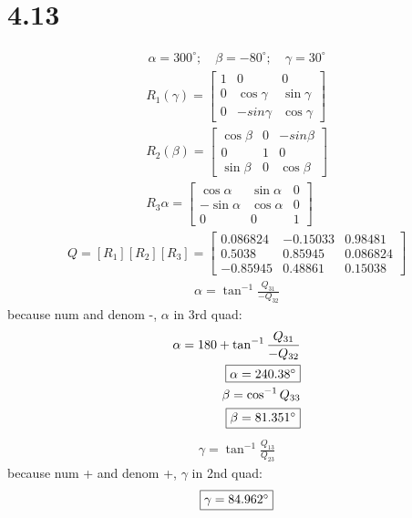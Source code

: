 \documentclass[12 pt]{article}
\begin{document}
\section*{4.13}
\begin{align*}
    \alpha=300^{\circ}; \quad \beta=-80^{\circ}; \quad \gamma=30^{\circ}
\end{align*}
\begin{align*}
    R_1(\gamma)=\begin{bmatrix}
        1 & 0 & 0 \\
        0 & \cos{\gamma} & \sin{\gamma} \\
        0 & -sin{\gamma} & \cos{\gamma}
    \end{bmatrix} \\
    R_2(\beta)=\begin{bmatrix}
        \cos{\beta} & 0 & -sin{\beta} \\
        0 & 1 & 0 \\
        \sin{\beta} & 0 & \cos{\beta}
    \end{bmatrix} \\
    R_3{\alpha}=\begin{bmatrix}
        \cos{\alpha} & \sin{\alpha} & 0 \\
        -\sin{\alpha} & \cos{\alpha} & 0 \\
        0 & 0 & 1
    \end{bmatrix}
\end{align*}
\begin{align*}
    Q = [R_1][R_2][R_3]=\begin{bmatrix}
        0.086824 & -0.15033 & 0.98481 \\
        0.5038 & 0.85945 & 0.086824 \\
        -0.85945 & 0.48861 & 0.15038
    \end{bmatrix}
\end{align*}
\begin{align*}
    \alpha= \tan^{-1}{\frac{Q_{31}}{-Q_{32}}}
\end{align*}
because num and denom -, $\alpha$ in 3rd quad:
\begin{align*}
    \alpha=180+\tan^{-1}{\frac{Q_{31}}{-Q_{32}}} \\
    \fbox{$\alpha=240.38^{\circ}$} \\
    \beta=\cos^{-1}{Q_{33}} \\
    \fbox{$\beta=81.351^{\circ}$}
\end{align*}
\begin{align*}
    \gamma = \tan^{-1}{\frac{Q_{13}}{Q_{23}}}
\end{align*}
because num + and denom +, $\gamma$ in 2nd quad:
\begin{align*}
    \fbox{$\gamma=84.962^{\circ}$}
\end{align*}
\end{document}
